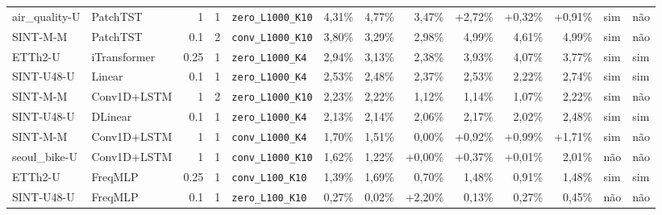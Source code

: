 \begin{longtable}{llrrlrrrrrrll}
air\_quality-U & PatchTST & 1 & 1 & \texttt{zero\_\allowbreak{}L1000\_\allowbreak{}K10} & \textminus{}4,31\% & \textminus{}4,77\% & \textminus{}3,47\% & +2,72\% & +0,32\% & +0,91\% & sim & n\~ao \\
SINT-M-M & PatchTST & 0.1 & 2 & \texttt{conv\_\allowbreak{}L1000\_\allowbreak{}K10} & \textminus{}3,80\% & \textminus{}3,29\% & \textminus{}2,98\% & \textminus{}4,99\% & \textminus{}4,61\% & \textminus{}4,99\% & sim & n\~ao \\
ETTh2-U & iTransformer & 0.25 & 1 & \texttt{zero\_\allowbreak{}L1000\_\allowbreak{}K4} & \textminus{}2,94\% & \textminus{}3,13\% & \textminus{}2,38\% & \textminus{}3,93\% & \textminus{}4,07\% & \textminus{}3,77\% & sim & sim \\
SINT-U48-U & Linear & 0.1 & 1 & \texttt{zero\_\allowbreak{}L1000\_\allowbreak{}K4} & \textminus{}2,53\% & \textminus{}2,48\% & \textminus{}2,37\% & \textminus{}2,53\% & \textminus{}2,22\% & \textminus{}2,74\% & sim & sim \\
SINT-M-M & Conv1D+LSTM & 1 & 2 & \texttt{zero\_\allowbreak{}L1000\_\allowbreak{}K10} & \textminus{}2,23\% & \textminus{}2,22\% & \textminus{}1,12\% & \textminus{}1,14\% & \textminus{}1,07\% & \textminus{}2,22\% & sim & n\~ao \\
SINT-U48-U & DLinear & 0.1 & 1 & \texttt{zero\_\allowbreak{}L1000\_\allowbreak{}K4} & \textminus{}2,13\% & \textminus{}2,14\% & \textminus{}2,06\% & \textminus{}2,17\% & \textminus{}2,02\% & \textminus{}2,48\% & sim & sim \\
SINT-M-M & Conv1D+LSTM & 1 & 1 & \texttt{conv\_\allowbreak{}L1000\_\allowbreak{}K4} & \textminus{}1,70\% & \textminus{}1,51\% & \textminus{}0,00\% & +0,92\% & +0,99\% & +1,71\% & sim & n\~ao \\
seoul\_bike-U & Conv1D+LSTM & 1 & 1 & \texttt{conv\_\allowbreak{}L1000\_\allowbreak{}K10} & \textminus{}1,62\% & \textminus{}1,22\% & +0,00\% & +0,37\% & +0,01\% & \textminus{}2,01\% & n\~ao & n\~ao \\
ETTh2-U & FreqMLP & 0.25 & 1 & \texttt{conv\_\allowbreak{}L100\_\allowbreak{}K10} & \textminus{}1,39\% & \textminus{}1,69\% & \textminus{}0,70\% & \textminus{}1,48\% & \textminus{}0,91\% & \textminus{}1,48\% & sim & sim \\
SINT-U48-U & FreqMLP & 0.1 & 1 & \texttt{zero\_\allowbreak{}L100\_\allowbreak{}K10} & \textminus{}0,27\% & \textminus{}0,02\% & +2,20\% & \textminus{}0,13\% & \textminus{}0,27\% & \textminus{}0,45\% & n\~ao & n\~ao \\
\end{longtable}
\normalsize
